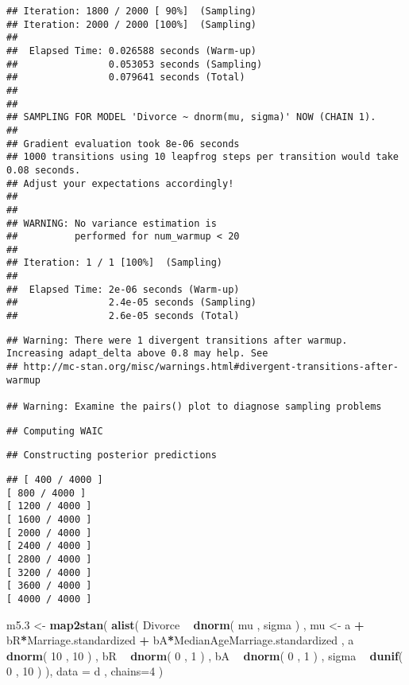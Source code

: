 \documentclass[]{article}
\newenvironment{Shaded}{\begin{snugshade}}{\end{snugshade}}
\newcommand{\KeywordTok}[1]{\textcolor[rgb]{0.13,0.29,0.53}{\textbf{#1}}}
\newcommand{\DataTypeTok}[1]{\textcolor[rgb]{0.13,0.29,0.53}{#1}}
\newcommand{\DecValTok}[1]{\textcolor[rgb]{0.00,0.00,0.81}{#1}}
\newcommand{\StringTok}[1]{\textcolor[rgb]{0.31,0.60,0.02}{#1}}
\newcommand{\OperatorTok}[1]{\textcolor[rgb]{0.81,0.36,0.00}{\textbf{#1}}}
\newcommand{\NormalTok}[1]{#1}
\begin{document}
\begin{verbatim}
## Iteration: 1800 / 2000 [ 90%]  (Sampling)
## Iteration: 2000 / 2000 [100%]  (Sampling)
## 
##  Elapsed Time: 0.026588 seconds (Warm-up)
##                0.053053 seconds (Sampling)
##                0.079641 seconds (Total)
## 
## 
## SAMPLING FOR MODEL 'Divorce ~ dnorm(mu, sigma)' NOW (CHAIN 1).
## 
## Gradient evaluation took 8e-06 seconds
## 1000 transitions using 10 leapfrog steps per transition would take 0.08 seconds.
## Adjust your expectations accordingly!
## 
## 
## WARNING: No variance estimation is
##          performed for num_warmup < 20
## 
## Iteration: 1 / 1 [100%]  (Sampling)
## 
##  Elapsed Time: 2e-06 seconds (Warm-up)
##                2.4e-05 seconds (Sampling)
##                2.6e-05 seconds (Total)
\end{verbatim}

\begin{verbatim}
## Warning: There were 1 divergent transitions after warmup. Increasing adapt_delta above 0.8 may help. See
## http://mc-stan.org/misc/warnings.html#divergent-transitions-after-warmup

## Warning: Examine the pairs() plot to diagnose sampling problems
\end{verbatim}

\begin{verbatim}
## Computing WAIC
\end{verbatim}

\begin{verbatim}
## Constructing posterior predictions
\end{verbatim}

\begin{verbatim}
## [ 400 / 4000 ]
[ 800 / 4000 ]
[ 1200 / 4000 ]
[ 1600 / 4000 ]
[ 2000 / 4000 ]
[ 2400 / 4000 ]
[ 2800 / 4000 ]
[ 3200 / 4000 ]
[ 3600 / 4000 ]
[ 4000 / 4000 ]
\end{verbatim}

\begin{Shaded}
\begin{Highlighting}[]
\NormalTok{m5.}\DecValTok{3}\NormalTok{ <-}\StringTok{ }\KeywordTok{map2stan}\NormalTok{(}
  \KeywordTok{alist}\NormalTok{(}
\NormalTok{    Divorce }\OperatorTok{~}\StringTok{ }\KeywordTok{dnorm}\NormalTok{( mu , sigma ) ,}
\NormalTok{    mu <-}\StringTok{ }\NormalTok{a }\OperatorTok{+}\StringTok{ }\NormalTok{bR}\OperatorTok{*}\NormalTok{Marriage.standardized }\OperatorTok{+}\StringTok{ }\NormalTok{bA}\OperatorTok{*}\NormalTok{MedianAgeMarriage.standardized ,}
\NormalTok{    a }\OperatorTok{~}\StringTok{ }\KeywordTok{dnorm}\NormalTok{( }\DecValTok{10}\NormalTok{ , }\DecValTok{10}\NormalTok{ ) ,}
\NormalTok{    bR }\OperatorTok{~}\StringTok{ }\KeywordTok{dnorm}\NormalTok{( }\DecValTok{0}\NormalTok{ , }\DecValTok{1}\NormalTok{ ) ,}
\NormalTok{    bA }\OperatorTok{~}\StringTok{ }\KeywordTok{dnorm}\NormalTok{( }\DecValTok{0}\NormalTok{ , }\DecValTok{1}\NormalTok{ ) ,}
\NormalTok{    sigma }\OperatorTok{~}\StringTok{ }\KeywordTok{dunif}\NormalTok{( }\DecValTok{0}\NormalTok{ , }\DecValTok{10}\NormalTok{ )}
\NormalTok{  ),}
  \DataTypeTok{data =}\NormalTok{ d , }\DataTypeTok{chains=}\DecValTok{4}\NormalTok{ )}
\end{Highlighting}
\end{Shaded}
\end{document}
